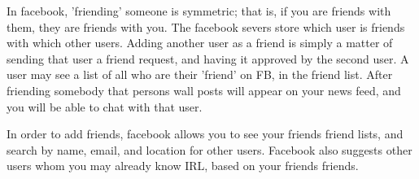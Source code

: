 In facebook, 'friending' someone is symmetric; that is, if you are friends with
them, they are friends with you. The facebook severs store which user is friends
with which other users. Adding another user as a friend is simply a matter of
sending that user a friend request, and having it approved by the second user. A
user may see a list of all who are their 'friend' on FB, in the friend list.
After friending somebody that persons wall posts will appear on your news feed,
and you will be able to chat with that user.

In order to add friends, facebook allows you to see your friends friend lists,
and search by name, email, and location for other users. Facebook also suggests
other users whom you may already know IRL, based on your friends friends.
